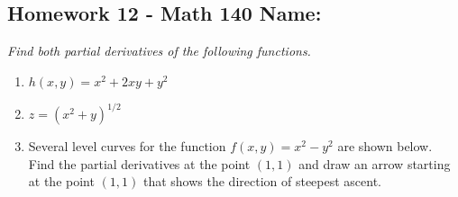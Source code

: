 \documentclass[10pt]{article}
\begin{document}
\pagestyle{empty}
\subsection*{Homework 12 - Math 140 \hfill Name: \underline{\hspace*{2in}}}

\noindent
\textit{Find both partial derivatives of the following functions.}

\begin{enumerate}
\item $h(x,y) = x^2 + 2xy + y^2$
\begin{enumerate}
\end{enumerate}
\vfill



\item $z = (x^2 + y)^{1/2}$
\begin{enumerate}
\end{enumerate}
\vfill


\item Several level curves for the function $f(x,y) = x^2 - y^2$ are shown below.  Find the partial derivatives at the point $(1,1)$ and draw an arrow starting at the point $(1,1)$ that shows the direction of steepest ascent.


\end{enumerate}
\end{document}
